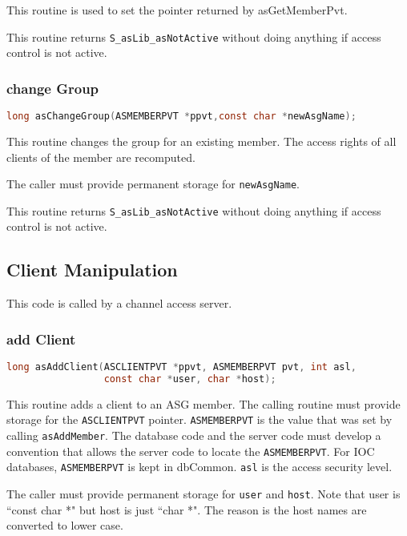 This routine is used to set the pointer returned by asGetMemberPvt.

This routine returns \verb|S_asLib_asNotActive| without doing anything if access control is not active.

\subsubsection{change Group}

\begin{lstlisting}[language=C]
long asChangeGroup(ASMEMBERPVT *ppvt,const char *newAsgName);
\end{lstlisting}
This routine changes the group for an existing member. The access rights of all clients of the member are recomputed.

The caller must provide permanent storage for \verb|newAsgName|.

This routine returns \verb|S_asLib_asNotActive| without doing anything if access control is not active.

\subsection{ Client Manipulation}

This code is called by a channel access server.

\subsubsection{add Client}

\begin{lstlisting}[language=C]
long asAddClient(ASCLIENTPVT *ppvt, ASMEMBERPVT pvt, int asl,
                 const char *user, char *host);
\end{lstlisting}

This routine adds a client to an ASG member.
The calling routine must provide storage for the \verb|ASCLIENTPVT| pointer.
\verb|ASMEMBERPVT| is the value that was set by calling \verb|asAddMember|.
The database code and the server code must develop a convention that allows the server code to locate the \verb|ASMEMBERPVT|.
For IOC databases, \verb|ASMEMBERPVT| is kept in dbCommon.
\verb|asl| is the access security level.

The caller must provide permanent storage for \verb|user| and \verb|host|.
Note that user is ``const char *" but host is just ``char *".
The reason is the host names are converted to lower case.

